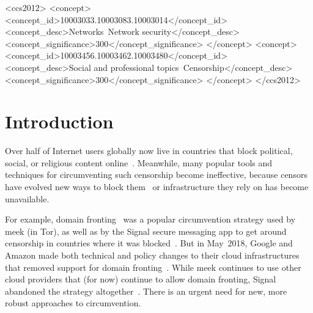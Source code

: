 \documentclass[sigconf]{acmart}
\begin{document}
\begin{CCSXML}
  <ccs2012>
  <concept>
  <concept_id>10003033.10003083.10003014</concept_id>
  <concept_desc>Networks~Network security</concept_desc>
  <concept_significance>300</concept_significance>
  </concept>
  <concept>
  <concept_id>10003456.10003462.10003480</concept_id>
  <concept_desc>Social and professional topics~Censorship</concept_desc>
  <concept_significance>300</concept_significance>
  </concept>
  </ccs2012>
\end{CCSXML}




\maketitle


\section{Introduction}

\FigHighLevel


Over half of Internet users globally
now live in countries that block political, social, or religious content
online~\cite{fotn2018}.
Meanwhile, many popular tools and techniques for circumventing such censorship
become ineffective, because censors have evolved new ways to block them~\cite{ensafi-tor,great-cannon}
or infrastructure they rely on has become unavailable.



For example, domain fronting~\cite{meek} was a popular circumvention
strategy used by meek (in Tor), as well as by the Signal secure messaging app to
get around censorship in countries where it was
blocked~\cite{signal,signal-domain-fronting}.
But in May~2018, Google and Amazon made both technical and policy changes to
their cloud infrastructures that removed support for domain
fronting~\cite{aws-front}. While meek
continues to use other cloud providers that (for now) continue to allow domain
fronting, Signal abandoned the strategy altogether~\cite{signal-back-on-front}.
There is an urgent need for new, more robust approaches to circumvention.
\end{document}
